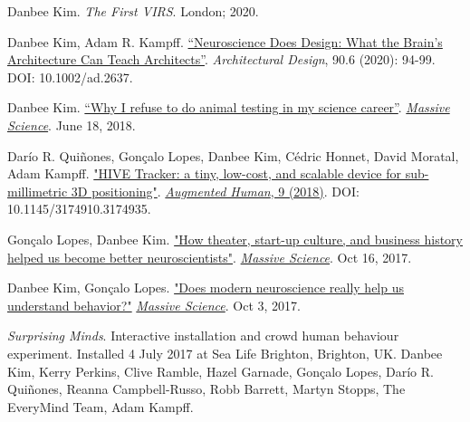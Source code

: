 \documentclass[]{friggeri-cv}
\begin{document}
\vspace{2mm}
Danbee Kim. \emph{The First VIRS}. London; 2020. 

\vspace{2mm}
Danbee Kim, Adam R. Kampff. \href{https://sci-hub.do/https://onlinelibrary.wiley.com/doi/abs/10.1002/ad.2637}{``Neuroscience Does Design: What the Brain's Architecture Can Teach Architects''}. \emph{Architectural Design}, 90.6 (2020): 94-99. DOI: 10.1002/ad.2637.

%
\vspace{2mm}
Danbee Kim. \href{https://massivesci.com/articles/frankenstein-kim-animal-testing/}{“Why I refuse to do animal testing in my science career”}. \emph{\href{https://massivesci.com}{Massive Science}}. June 18, 2018.

\vspace{2mm}
Dar\'{i}o R. Qui\~{n}ones, Gon\c{c}alo Lopes, Danbee Kim, C\'{e}dric Honnet, David Moratal, Adam Kampff. \href{https://www.researchgate.net/publication/322842913_HIVE_Tracker_a_tiny_low-cost_and_scalable_device_for_sub-millimetric_3D_positioning}{"HIVE Tracker: a tiny, low-cost, and scalable device for sub-millimetric 3D positioning"}. \href{http://www.sigah.org/AH2018/}{\emph{Augmented Human}, 9 (2018)}. DOI: 10.1145/3174910.3174935.

\vspace{2mm}
Gon\c{c}alo Lopes, Danbee Kim. \href{https://massivesci.com/articles/neuroscience-can-learn-from-theater/}{"How theater, start-up culture, and business history helped us become better neuroscientists"}. \emph{\href{https://massivesci.com}{Massive Science}}. Oct 16, 2017.

\vspace{2mm}
Danbee Kim, Gon\c{c}alo Lopes. \href{https://massivesci.com/articles/neuroscience-behavior-vs-technology/}{"Does modern neuroscience really help us understand behavior?"} \emph{\href{https://massivesci.com}{Massive Science}}. Oct 3, 2017. 

\vspace{2mm}
\emph{Surprising Minds}. Interactive installation and crowd human behaviour experiment. Installed 4 July 2017 at Sea Life Brighton, Brighton, UK. Danbee Kim, Kerry Perkins, Clive Ramble, Hazel Garnade, Gon\c{c}alo Lopes, Dar\'{i}o R. Qui\~{n}ones, Reanna Campbell-Russo, Robb Barrett, Martyn Stopps, The EveryMind Team, Adam Kampff.
\end{document}
